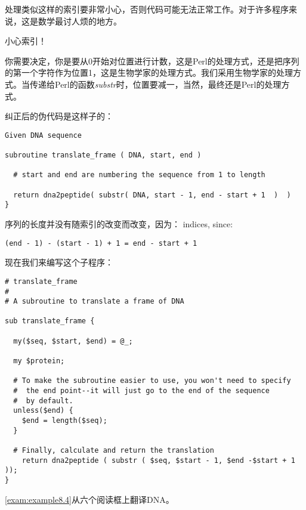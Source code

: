 处理类似这样的索引要非常小心，否则代码可能无法正常工作。对于许多程序来说，这是数学最讨人烦的地方。


\begin{adjustwidth}{4em}{4em}
\noindent
小心索引！
\end{adjustwidth}

你需要决定，你是要从0开始对位置进行计数，这是Perl的处理方式，还是把序列的第一个字符作为位置1，这是生物学家的处理方式。我们采用生物学家的处理方式。当传递给Perl的函数\textit{substr}时，位置要减一，当然，最终还是Perl的处理方式。

纠正后的伪代码是这样子的：

\begin{lstlisting}
Given DNA sequence

subroutine translate_frame ( DNA, start, end )

  # start and end are numbering the sequence from 1 to length

  return dna2peptide( substr( DNA, start - 1, end - start + 1  )  )
}
\end{lstlisting}

序列的长度并没有随索引的改变而改变，因为：
indices, since:

\begin{lstlisting}
(end - 1) - (start - 1) + 1 = end - start + 1
\end{lstlisting}

现在我们来编写这个子程序：

\begin{lstlisting}
# translate_frame
#
# A subroutine to translate a frame of DNA

sub translate_frame {

  my($seq, $start, $end) = @_;

  my $protein;

  # To make the subroutine easier to use, you won't need to specify
  #  the end point--it will just go to the end of the sequence
  #  by default.
  unless($end) {
    $end = length($seq);
  }

  # Finally, calculate and return the translation
    return dna2peptide ( substr ( $seq, $start - 1, $end -$start + 1 ));
}
\end{lstlisting}

\autoref{exam:example8.4}从六个阅读框上翻译DNA。



